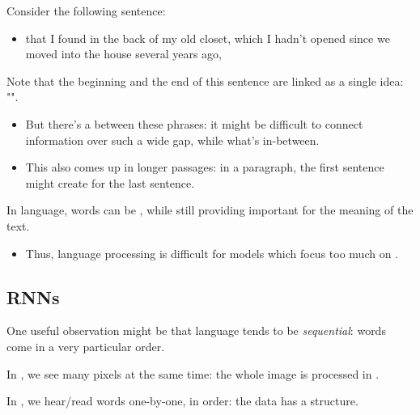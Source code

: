     \miniex Consider the following sentence: 

    \begin{itemize}
        \item {} that I found in the back of my old closet, which I hadn't opened since we moved into the house several years ago, 
    \end{itemize}

    \phantom{}

    Note that the beginning and the end of this sentence are linked as a single idea: "".

    \begin{itemize}
        \item But there's a  between these phrases: it might be difficult to connect information over such a wide gap, while  what's in-between. 

        \item This also comes up in longer passages: in a paragraph, the first sentence might create  for the last sentence.
           
    \end{itemize}

    \begin{concept}
        In language, words can be , while still providing important  for the meaning of the text.

        \begin{itemize}
            \item Thus, language processing is difficult for models which focus too much on .
        \end{itemize}
    \end{concept}

\phantom{}

\subsection{RNNs}

    One useful observation might be that language tends to be \textit{sequential}: words come in a very particular order.\\

    \begin{concept}
        In , we see many pixels at the same time: the whole image is processed in .

        In , we hear/read words one-by-one, in order: the data has a  structure.
    \end{concept}


